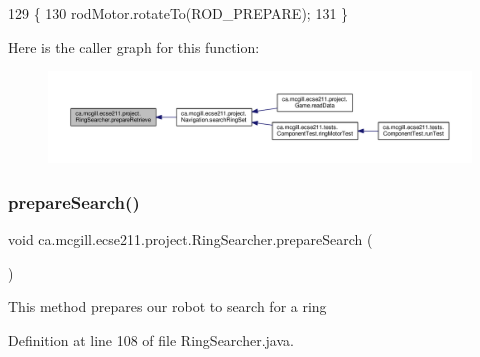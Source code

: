 \begin{DoxyCode}
129                                 \{
130     rodMotor.rotateTo(ROD\_PREPARE);
131   \}
\end{DoxyCode}
Here is the caller graph for this function\+:\nopagebreak
\begin{figure}[H]
\begin{center}
\leavevmode
\includegraphics[width=350pt]{classca_1_1mcgill_1_1ecse211_1_1project_1_1_ring_searcher_a3de30b85b1445157d7f8572992de7651_icgraph}
\end{center}
\end{figure}
\mbox{\label{classca_1_1mcgill_1_1ecse211_1_1project_1_1_ring_searcher_abf31c36cadb144a4651b11f7fa37120a}} 
\subsubsection{\texorpdfstring{prepare\+Search()}{prepareSearch()}}
{\footnotesize\ttfamily void ca.\+mcgill.\+ecse211.\+project.\+Ring\+Searcher.\+prepare\+Search (\begin{DoxyParamCaption}{ }\end{DoxyParamCaption})}

This method prepares our robot to search for a ring 

Definition at line 108 of file Ring\+Searcher.\+java.


